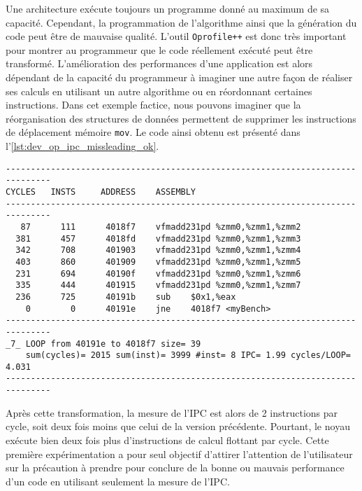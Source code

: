         Une architecture exécute toujours un programme donné au maximum de sa capacité. Cependant, la programmation de l'algorithme ainsi que la génération du code peut être de mauvaise qualité. L'outil \verb=Oprofile++= est donc très important pour montrer au programmeur que le code réellement exécuté peut être transformé. L'amélioration des performances d'une application est alors dépendant de la capacité du programmeur à imaginer une autre façon de réaliser ses calculs en utilisant un autre algorithme ou en réordonnant certaines instructions. Dans cet exemple factice, nous pouvons imaginer que la réorganisation des structures de données permettent de supprimer les instructions de déplacement mémoire \verb=mov=. Le code ainsi obtenu est présenté dans  l'\autoref{lst:dev_op_ipc_missleading_ok}. 
    
\begin{lstlisting}[label=lst:dev_op_ipc_missleading_ok, caption=Noyau de calcul exécutant deux opérations de calcul par cycle.]
-------------------------------------------------------------------------------
CYCLES   INSTS     ADDRESS    ASSEMBLY                         
-------------------------------------------------------------------------------
   87      111      4018f7    vfmadd231pd %zmm0,%zmm1,%zmm2
  381      457      4018fd    vfmadd231pd %zmm0,%zmm1,%zmm3
  342      708      401903    vfmadd231pd %zmm0,%zmm1,%zmm4
  403      860      401909    vfmadd231pd %zmm0,%zmm1,%zmm5
  231      694      40190f    vfmadd231pd %zmm0,%zmm1,%zmm6
  335      444      401915    vfmadd231pd %zmm0,%zmm1,%zmm7
  236      725      40191b    sub    $0x1,%eax
    0        0      40191e    jne    4018f7 <myBench>
-------------------------------------------------------------------------------
_7_ LOOP from 40191e to 4018f7 size= 39
    sum(cycles)= 2015 sum(inst)= 3999 #inst= 8 IPC= 1.99 cycles/LOOP= 4.031
-------------------------------------------------------------------------------
\end{lstlisting}

        Après cette transformation, la mesure de l'IPC est alors de 2 instructions par cycle, soit deux fois moins que celui de la version précédente. Pourtant, le noyau exécute bien deux fois plus d'instructions de calcul flottant par cycle. Cette première expérimentation a pour seul objectif d'attirer l'attention de l'utilisateur sur la précaution à prendre pour conclure de la bonne ou mauvais performance d'un code en utilisant seulement la mesure de l'IPC. 
        



